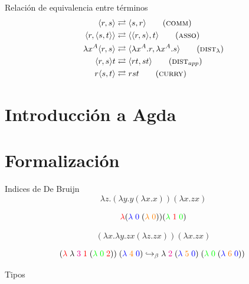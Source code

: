 \documentclass[aspectratio=149]{beamer}
\begin{document}
\begin{frame}{Relación de equivalencia entre términos}
	\begin{align}
		\langle r,s \rangle &\rightleftarrows \langle s,r \rangle \tag{\textsc{comm}} \\
		\langle r, \langle s,t \rangle \rangle &\rightleftarrows \langle \langle r, s \rangle, t \rangle \tag{\textsc{asso}} \\
		\lambda x^A \langle r,s \rangle &\rightleftarrows \langle \lambda x^A.r, \lambda x^A.s \rangle \tag{$\textsc{dist}_{\lambda}$} \\
		\langle r,s \rangle t &\rightleftarrows \langle r t, s t \rangle \tag{$\textsc{dist}_{app}$} \\
		r \langle s, t \rangle &\rightleftarrows r s t \tag{\textsc{curry}}
	\end{align}
\end{frame}

\section{Introducción a Agda}
\section{Formalización}

\begin{frame}{Indices de De Bruijn}
	\[ \lambda z. (\lambda y. y (\lambda x. x)) (\lambda x. z x) \]
	
	\[ \textcolor{red}{\lambda} (\textcolor{blue}{\lambda\; 0} \; (\textcolor{orange}{\lambda\; 0})) (\textcolor{green}{\lambda}\; \textcolor{red}{1} \; \textcolor{green}{0}) \]
	
	\[ (\lambda x. \lambda y. z x (\lambda z. z x)) (\lambda x. z x) \]
	
	\[
	(\textcolor{red}{\lambda}\; \lambda\; \textcolor{magenta}{3}\; \textcolor{red}{1}\; (\textcolor{green}{\lambda\; 0}\; \textcolor{red}{2}))\; (\textcolor{blue}{\lambda}\; \textcolor{orange}{4}\; \textcolor{blue}{0})
	\hookrightarrow_\beta
	\lambda \; \textcolor{magenta}{2} \; (\textcolor{blue}{\lambda}\; \textcolor{orange}{5}\; \textcolor{blue}{0})\; (\textcolor{green}{\lambda\; 0}\; (\textcolor{blue}{\lambda}\; \textcolor{orange}{6}\; \textcolor{blue}{0}))\;
	\]
\end{frame}


\begin{frame}{Tipos}
	
\end{frame}
\end{document}
